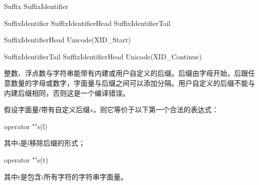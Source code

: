\begin{bnf}{Suffix}
    \terminal{_}\bnfq SuffixIdentifier
\end{bnf}

\begin{bnf}{SuffixIdentifier}
    SuffixIdentifierHead SuffixIdentifierTail\bnfs
\end{bnf}

\begin{bnf}{SuffixIdentifierHead}
    Unicode(XID_Start)
\end{bnf}

\begin{bnf}{SuffixIdentifierTail}
    SuffixIdentifierHead \br
    Unicode(XID_Continue)
\end{bnf}

\pnum
整数、浮点数与字符串能带有内建或用户自定义的后缀。后缀由字母开始，后跟任意数量的字母或数字，字面量与后缀之间可以添加\tcode{_}分隔。用户自定义的后缀不能与内建后缀相同，否则这是一个编译错误。

\pnum
假设字面量$l$带有自定义后缀$s$，则它等价于以下第一个合法的表达式：
\begin{codeblock}
    operator ""s(l)
\end{codeblock}
其中$i$是$l$移除后缀的形式；
\begin{codeblock}
    operator ""s(t)
\end{codeblock}
其中$t$是包含$i$所有字符的字符串字面量。